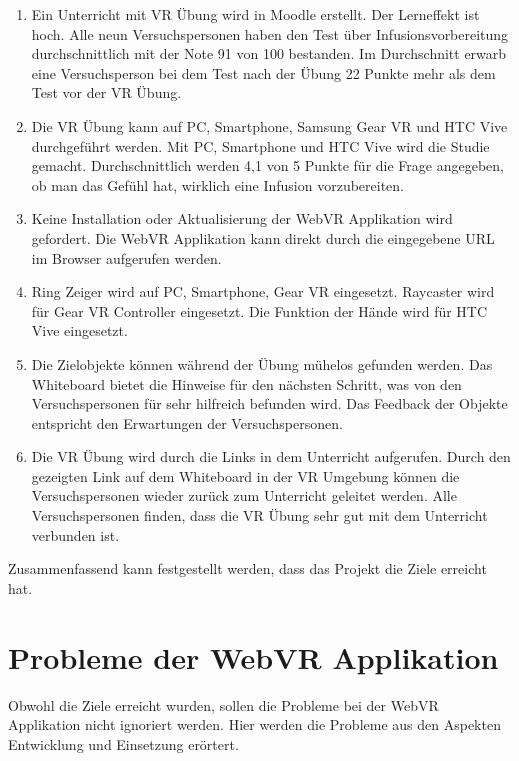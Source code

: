 \begin{enumerate}[labelsep=1ex]
	\renewcommand{\labelenumi}{\textbf{Z\theenumi.}}
	\item Ein Unterricht mit VR Übung wird in Moodle erstellt. Der Lerneffekt ist hoch. Alle neun Versuchspersonen haben den Test über Infusionsvorbereitung durchschnittlich mit der Note 91 von 100 bestanden. Im Durchschnitt erwarb eine Versuchsperson bei dem Test nach der Übung 22 Punkte mehr als dem Test vor der VR Übung.
	
	\item Die VR Übung kann auf PC, Smartphone, Samsung Gear VR und HTC Vive durchgeführt werden. Mit PC, Smartphone und HTC Vive wird die Studie gemacht. Durchschnittlich werden 4,1 von 5 Punkte für die Frage angegeben, ob man das Gefühl hat, wirklich eine Infusion vorzubereiten.
	
	\item Keine Installation oder Aktualisierung der WebVR Applikation wird gefordert. Die WebVR Applikation kann direkt durch die eingegebene URL im Browser aufgerufen werden.
	
	\item Ring Zeiger wird auf PC, Smartphone, Gear VR eingesetzt. Raycaster wird für Gear VR Controller eingesetzt. Die Funktion der Hände wird für HTC Vive eingesetzt.
	
	\item Die Zielobjekte können während der Übung mühelos gefunden werden. Das Whiteboard bietet die Hinweise für den nächsten Schritt, was von den Versuchspersonen für sehr hilfreich befunden wird. Das Feedback der Objekte entspricht den Erwartungen der Versuchspersonen.
	
	\item Die VR Übung wird durch die Links in dem Unterricht aufgerufen. Durch den gezeigten Link auf dem Whiteboard in der VR Umgebung können die Versuchspersonen wieder zurück zum Unterricht geleitet werden. Alle Versuchspersonen finden, dass die VR Übung sehr gut mit dem Unterricht verbunden ist.
	
\end{enumerate}

Zusammenfassend kann festgestellt werden, dass das Projekt die Ziele erreicht hat.

\section{Probleme der WebVR Applikation}
Obwohl die Ziele erreicht wurden, sollen die Probleme bei der WebVR Applikation nicht ignoriert werden. Hier werden die Probleme aus den Aspekten Entwicklung und Einsetzung erörtert.

